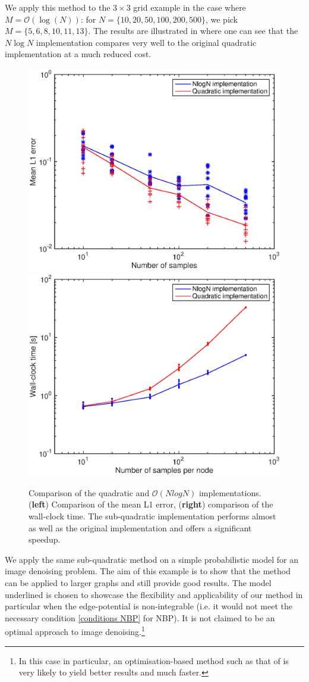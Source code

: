 We apply this method to the $3\times 3$ grid example in the case where $M=\mathcal O(\log(N))$: for $N=\{10,20,50,100,200,500\}$, we pick $M=\{5, 6,8,10,11,13\}$. The results are illustrated in  where one can see that the $N\log N$ implementation compares very well to the original quadratic implementation at a much reduced cost. 


\begin{figure}[!h]
\center
\includegraphics[width=.51\textwidth]{figures/epbp/errCompNLOGN}
\hspace*{-.7cm}
\includegraphics[width=.51\textwidth]{figures/epbp/timeCompNLOGN}
\caption{\label{figCompNLOGN}Comparison of the quadratic and $\mathcal O(N log N )$ implementations. (\textbf{left}) Comparison of the mean L1 error, (\textbf{right}) comparison of the wall-clock time. The sub-quadratic implementation performs almost as well as the original implementation and offers a significant speedup.}
\end{figure}


We apply the same sub-quadratic method on a simple probabilistic model for an image denoising problem. The aim of this example is to show that the method can be applied to larger graphs and still provide good results. The model underlined is chosen to showcase the flexibility and applicability of our method in particular when the edge-potential is non-integrable (i.e. it would not meet the necessary condition \eqref{conditions NBP} for NBP). 
It is not claimed to be an optimal approach to image denoising.\footnote{In this case in particular, an optimisation-based method such as that of \citet{rudin92} is very likely to yield better results and much faster.}


